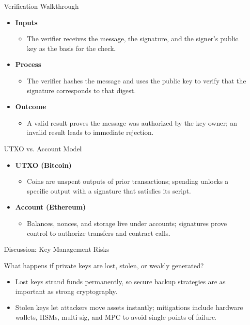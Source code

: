 \documentclass[aspectratio=169]{beamer}
\newcommand{\qbox}[1]{\begin{tcolorbox}#1\end{tcolorbox}}
\begin{document}
\begin{frame}{Verification Walkthrough}
  \begin{itemize}
    \item \textbf{Inputs}
      \begin{itemize}
        \item The verifier receives the message, the signature, and the signer’s public key as the basis for the check.
      \end{itemize}
    \item \textbf{Process}
      \begin{itemize}
        \item The verifier hashes the message and uses the public key to verify that the signature corresponds to that digest.
      \end{itemize}
    \item \textbf{Outcome}
      \begin{itemize}
        \item A valid result proves the message was authorized by the key owner; an invalid result leads to immediate rejection.
      \end{itemize}
  \end{itemize}
\end{frame}

\begin{frame}{UTXO vs. Account Model}
  \begin{itemize}
    \item \textbf{UTXO (Bitcoin)}
      \begin{itemize}
        \item Coins are unspent outputs of prior transactions; spending unlocks a specific output with a signature that satisfies its script.
      \end{itemize}
    \item \textbf{Account (Ethereum)}
      \begin{itemize}
        \item Balances, nonces, and storage live under accounts; signatures prove control to authorize transfers and contract calls.
      \end{itemize}
  \end{itemize}
\end{frame}

\begin{frame}{Discussion: Key Management Risks}
  \qbox{What happens if private keys are lost, stolen, or weakly generated?}
  \begin{itemize}
    \item Lost keys strand funds permanently, so secure backup strategies are as important as strong cryptography.
    \item Stolen keys let attackers move assets instantly; mitigations include hardware wallets, HSMs, multi-sig, and MPC to avoid single points of failure.
  \end{itemize}
\end{frame}
\end{document}

